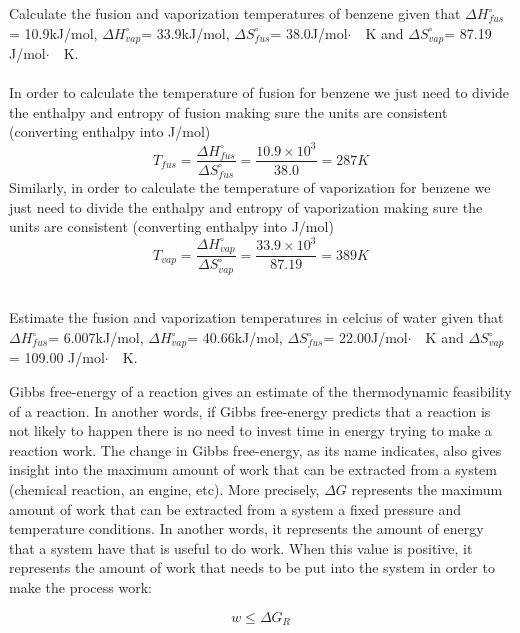 \documentclass[main.tex]{subfiles}
\newcommand\chapterlabel{entropy}
\begin{document}
\begin{description}
\begin{example} %
Calculate the fusion and vaporization temperatures of benzene given that $\Delta H^{\circ}_{fus}$= 10.9kJ/mol, $\Delta H^{\circ}_{vap}$= 33.9kJ/mol, $\Delta S^{\circ}_{fus}$= 38.0J/mol$\cdot\text{ }$ K and $\Delta S^{\circ}_{vap}$= 87.19 J/mol$\cdot\text{ }$ K. \\
\\
In order to calculate the temperature of fusion for benzene we just need to divide the enthalpy and entropy of fusion making sure the units are consistent (converting enthalpy into J/mol)
\[T_{fus}=\frac{\Delta H^{\circ}_{fus}}{\Delta S^{\circ}_{fus}} =\frac{10.9\times 10^3}{38.0}=287K	\]
Similarly, in order to calculate the temperature of vaporization for benzene we just need to divide the enthalpy and entropy of vaporization making sure the units are consistent (converting enthalpy into J/mol)
\[T_{vap}=\frac{\Delta H^{\circ}_{vap}}{\Delta S^{\circ}_{vap}} =\frac{33.9\times 10^3}{87.19}=389K	\]

\faDiamond\ \\
Estimate the fusion and vaporization temperatures in celcius of water given that $\Delta H^{\circ}_{fus}$= 6.007kJ/mol, $\Delta H^{\circ}_{vap}$= 40.66kJ/mol, $\Delta S^{\circ}_{fus}$=  22.00J/mol$\cdot\text{ }$ K and $\Delta S^{\circ}_{vap}$= 109.00 J/mol$\cdot\text{ }$ K.\\ 
\end{example}%

\item[\docfilehook{Gibbs free-energy and work}{ }] 
Gibbs free-energy of a reaction gives an estimate of the thermodynamic feasibility of a reaction. In another words, if Gibbs free-energy predicts that a reaction is not likely to happen there is no need to invest time in energy trying to make a reaction work. The change in Gibbs free-energy, as its name indicates, also gives insight into the maximum amount of work that can be extracted from a system (chemical reaction, an engine, etc). More precisely, $\Delta G$ represents the maximum amount of work that can be extracted from a system a fixed pressure and temperature conditions. In another words, it represents the amount of energy that a system have that is useful to do work. When this value is positive, it represents the amount of work that needs to be put into the system in order to make the process work:

\begin{equation}
\boxed{ w\leq \Delta G_R 	}\label{\chapterlabel:equation13}
\end{equation}
\end{description}
\end{document}
